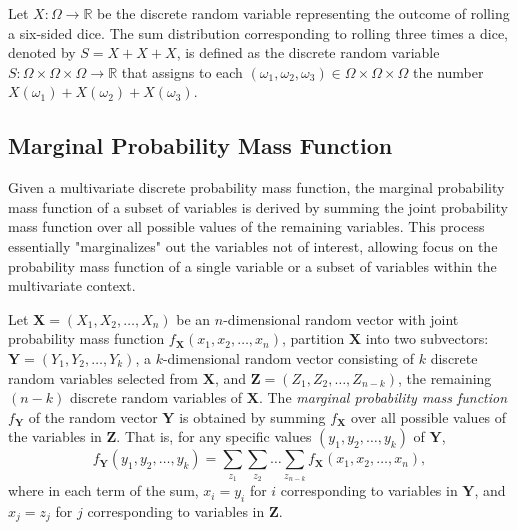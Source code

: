 \begin{example}
Let $X: \Omega \rightarrow \mathbb{R}$ be the discrete random variable representing the outcome of rolling a six-sided dice. The sum distribution corresponding to rolling three times a dice, denoted by $S = X + X + X$, is defined as the discrete random variable $S: \Omega \times \Omega \times \Omega \rightarrow \mathbb{R}$ that assigns to each $\left( \omega_1, \omega_2, \omega_3 \right) \in \Omega \times \Omega \times \Omega$ the number $X \left( \omega_1 \right) + X \left( \omega_2 \right) + X \left( \omega_3 \right)$.
\end{example}


\subsection{Marginal Probability Mass Function}


Given a multivariate discrete probability mass function, the marginal probability mass function of a subset of variables is derived by summing the joint probability mass function over all possible values of the remaining variables. This process essentially "marginalizes" out the variables not of interest, allowing focus on the probability mass function of a single variable or a subset of variables within the multivariate context.

\begin{definition}
Let $\mathbf{X} = (X_{1}, X_{2}, \ldots, X_{n})$ be an $n$-dimensional random vector with joint probability mass function $f_{\mathbf{X}}(x_{1}, x_{2}, \ldots, x_{n})$, partition $\mathbf{X}$ into two subvectors: $\mathbf{Y} = (Y_{1}, Y_{2}, \ldots, Y_{k})$, a $k$-dimensional random vector consisting of $k$ discrete random variables selected from $\mathbf{X}$, and $\mathbf{Z} = (Z_{1}, Z_{2}, \ldots, Z_{n-k})$, the remaining $(n - k)$ discrete random variables of $\mathbf{X}$. The \emph{marginal probability mass function} $f_{\mathbf{Y}}$ of the random vector $\mathbf{Y}$ is obtained by summing $f_{\mathbf{X}}$ over all possible values of the variables in $\mathbf{Z}$. That is, for any specific values $(y_{1}, y_{2}, \ldots, y_{k})$ of $\mathbf{Y}$,
\[
f_{\mathbf{Y}}(y_{1}, y_{2}, \ldots, y_{k}) = \sum_{z_{1}} \sum_{z_{2}} \ldots \sum_{z_{n-k}} f_{\mathbf{X}}(x_{1}, x_{2}, \ldots, x_{n}),
\]
where in each term of the sum, $x_{i} = y_{i}$ for $i$ corresponding to variables in $\mathbf{Y}$, and $x_{j} = z_{j}$ for $j$ corresponding to variables in $\mathbf{Z}$.
\end{definition}

